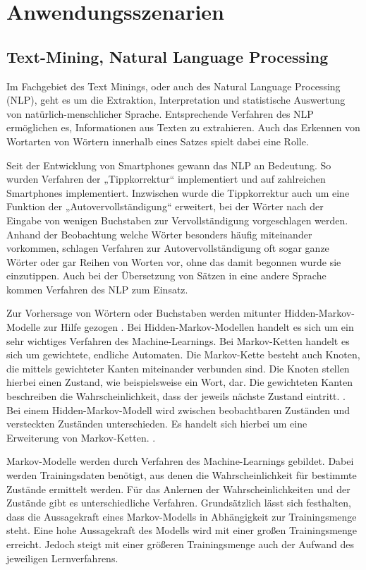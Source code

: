 \chapter{Anwendungsszenarien}
\section{Text-Mining, Natural Language Processing}
Im Fachgebiet des Text Minings, oder auch des Natural Language Processing (NLP), geht es um die Extraktion, Interpretation und statistische Auswertung von natürlich-menschlicher Sprache. Entsprechende Verfahren des NLP ermöglichen es, Informationen aus Texten zu extrahieren. Auch das Erkennen von Wortarten von Wörtern innerhalb eines Satzes spielt dabei eine Rolle.

Seit der Entwicklung von Smartphones gewann das NLP an Bedeutung. So wurden Verfahren der „Tippkorrektur“ implementiert und auf zahlreichen Smartphones implementiert. Inzwischen wurde die Tippkorrektur auch um eine Funktion der „Autovervollständigung“ erweitert, bei der Wörter nach der Eingabe von wenigen Buchstaben zur Vervollständigung vorgeschlagen werden. Anhand der Beobachtung welche Wörter besonders häufig miteinander vorkommen, schlagen Verfahren zur Autovervollständigung oft sogar ganze Wörter oder gar Reihen von Worten vor, ohne das damit begonnen wurde sie einzutippen. Auch bei der Übersetzung von Sätzen in eine andere Sprache kommen Verfahren des NLP zum Einsatz.

Zur Vorhersage von Wörtern oder Buchstaben werden mitunter Hidden-Markov-Modelle zur Hilfe gezogen \cite[p.~207]{jurafsky01}. Bei Hidden-Markov-Modellen handelt es sich um ein sehr wichtiges Verfahren des Machine-Learnings. Bei Markov-Ketten handelt es sich um gewichtete, endliche Automaten. Die Markov-Kette besteht auch Knoten, die mittels gewichteter Kanten miteinander verbunden sind. Die Knoten stellen hierbei einen Zustand, wie beispielsweise ein Wort, dar. Die gewichteten Kanten beschreiben die Wahrscheinlichkeit, dass der jeweils nächste Zustand eintritt. \cite[p.~208 ff.]{jurafsky01}\cite[p.~318 ff.]{manning01}. Bei einem Hidden-Markov-Modell wird zwischen beobachtbaren Zuständen und versteckten Zuständen unterschieden. Es handelt sich hierbei um eine Erweiterung von Markov-Ketten. \cite[p.~211 ff.]{jurafsky01}.

Markov-Modelle werden durch Verfahren des Machine-Learnings gebildet. Dabei werden Trainingsdaten benötigt, aus denen die Wahrscheinlichkeit für bestimmte Zustände ermittelt werden. Für das Anlernen der Wahrscheinlichkeiten und der Zustände gibt es unterschiedliche Verfahren. \cite[p.~213 ff.]{jurafsky01}\cite[p.~326 ff.]{manning01} Grundsätzlich lässt sich festhalten, dass die Aussagekraft eines Markov-Modells in Abhängigkeit zur Trainingsmenge steht. Eine hohe Aussagekraft des Modells wird mit einer großen Trainingsmenge erreicht. Jedoch steigt mit einer größeren Trainingsmenge auch der Aufwand des jeweiligen Lernverfahrens.

